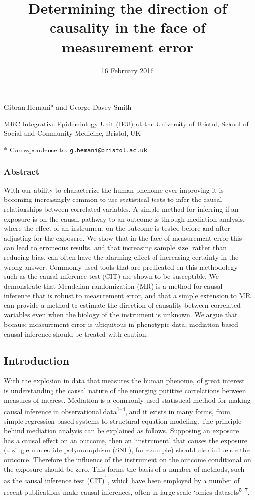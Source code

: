 \documentclass[]{article}
\title{Determining the direction of causality in the face of measurement error}
\author{}
\date{16 February 2016}
\begin{document}
\maketitle


Gibran Hemani* and George Davey Smith

MRC Integrative Epidemiology Unit (IEU) at the University of Bristol,
School of Social and Community Medicine, Bristol, UK

* Correspondence to:
\href{mailto:g.hemani@bristol.ac.uk}{\nolinkurl{g.hemani@bristol.ac.uk}}

\subsubsection{Abstract}\label{abstract}

With our ability to characterize the human phenome ever improving it is
becoming increasingly common to use statistical tests to infer the
causal relationships between correlated variables. A simple method for
inferring if an exposure is on the causal pathway to an outcome is
through mediation analysis, where the effect of an instrument on the
outcome is tested before and after adjusting for the exposure. We show
that in the face of measurement error this can lead to erroneous
results, and that increasing sample size, rather than reducing bias, can
often have the alarming effect of increasing certainty in the wrong
answer. Commonly used tools that are predicated on this methodology such
as the causal inference test (CIT) are shown to be susceptible. We
demonstrate that Mendelian randomization (MR) is a method for causal
inference that is robust to measurement error, and that a simple
extension to MR can provide a method to estimate the direction of
causality between correlated variables even when the biology of the
instrument is unknown. We argue that because measurement error is
ubiquitous in phenotypic data, mediation-based causal inference should
be treated with caution.

\subsection{Introduction}\label{introduction}

With the explosion in data that measures the human phenome, of great
interest is understanding the causal nature of the emerging putitive
correlations between measures of interest. Mediation is a commonly used
statistical method for making causal inference in observational
data\textsuperscript{1--4}, and it exists in many forms, from simple
regression based systems to structural equation modeling. The principle
behind mediation analysis can be explained as follows. Supposing an
exposure has a causal effect on an outcome, then an `instrument' that
causes the exposure (a single nucleotide polymorophism (SNP), for
example) should also influence the outcome. Therefore the influence of
the instrument on the outcome conditional on the exposure should be
zero. This forms the basis of a number of methods, such as the causal
inference test (CIT)\textsuperscript{1}, which have been employed by a
number of recent publications make causal inferences, often in large
scale `omics datasets\textsuperscript{5--7}.
\end{document}
